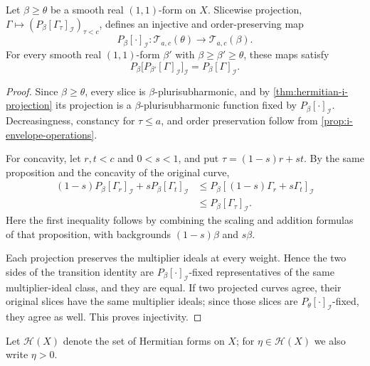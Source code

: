 \begin{proposition}\label{prop:hermitian-i-curve-transition}
Let $\beta\geq\theta$ be a smooth real $(1,1)$-form on $X$. Slicewise projection, $\Gamma\mapsto(P_\beta[\Gamma_\tau]_{\mathcal I})_{\tau<c}$, defines an injective and order-preserving map
\[
 P_\beta[\cdot]_{\mathcal I}\colon\mathscr T_{a,c}(\theta)\longrightarrow
                       \mathscr T_{a,c}(\beta).
\]
For every smooth real $(1,1)$-form $\beta'$ with $\beta\geq\beta'\geq\theta$, these maps satisfy
\[
 P_\beta\bigl[P_{\beta'}[\Gamma]_{\mathcal I}\bigr]_{\mathcal I}=P_\beta[\Gamma]_{\mathcal I}.
\]
\end{proposition}
\begin{proof}
Since $\beta\geq\theta$, every slice is $\beta$-plurisubharmonic, and by \cref{thm:hermitian-i-projection} its projection is a $\beta$-plurisubharmonic function fixed by $P_\beta[\cdot]_{\mathcal I}$. Decreasingness, constancy for $\tau\leq a$, and order preservation follow from \cref{prop:i-envelope-operations}.

For concavity, let $r,t<c$ and $0<s<1$, and put $\tau=(1-s)r+s t$. By the same proposition and the concavity of the original curve,
\[
 \begin{split}
 (1-s)P_\beta[\Gamma_r]_{\mathcal I}+sP_\beta[\Gamma_t]_{\mathcal I}
 &\leq P_\beta[(1-s)\Gamma_r+s\Gamma_t]_{\mathcal I}\\
 &\leq P_\beta[\Gamma_\tau]_{\mathcal I}.
 \end{split}
\]
Here the first inequality follows by combining the scaling and addition formulas of that proposition, with backgrounds $(1-s)\beta$ and $s\beta$.

Each projection preserves the multiplier ideals at every weight. Hence the two sides of the transition identity are $P_\beta[\cdot]_{\mathcal I}$-fixed representatives of the same multiplier-ideal class, and they are equal. If two projected curves agree, their original slices have the same multiplier ideals; since those slices are $P_\theta[\cdot]_{\mathcal I}$-fixed, they agree as well. This proves injectivity.
\end{proof}

Let $\mathscr H(X)$ denote the set of Hermitian forms on $X$; for $\eta\in\mathscr H(X)$ we also write $\eta>0$.

